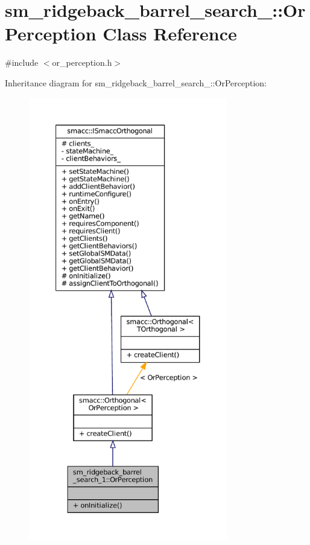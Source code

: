 \hypertarget{classsm__ridgeback__barrel__search__1_1_1OrPerception}{}\section{sm\+\_\+ridgeback\+\_\+barrel\+\_\+search\+\_\+:\+:Or\+Perception Class Reference}
\label{classsm__ridgeback__barrel__search__1_1_1OrPerception}


{\ttfamily \#include $<$or\+\_\+perception.\+h$>$}



Inheritance diagram for sm\+\_\+ridgeback\+\_\+barrel\+\_\+search\+\_\+:\+:Or\+Perception\+:
\nopagebreak
\begin{figure}[H]
\begin{center}
\leavevmode
\includegraphics[height=550pt]{classsm__ridgeback__barrel__search__1_1_1OrPerception__inherit__graph}
\end{center}
\end{figure}


